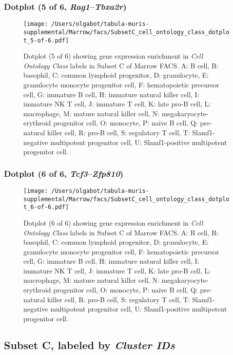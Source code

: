 \subsubsection{Dotplot (5 of 6, \emph{Rag1}--\emph{Tbxa2r})}
\begin{figure}[h]
\centering
\texttt{[image: /Users/olgabot/tabula-muris-supplemental/Marrow/facs/SubsetC\_cell\_ontology\_class\_dotplot\_5-of-6.pdf]}

\caption{ Dotplot (5 of 6)  showing gene expression enrichment in \emph{Cell Ontology Class} labels in Subset C of Marrow FACS. A: B cell, B: basophil, C: common lymphoid progenitor, D: granulocyte, E: granulocyte monocyte progenitor cell, F: hematopoietic precursor cell, G: immature B cell, H: immature natural killer cell, I: immature NK T cell, J: immature T cell, K: late pro-B cell, L: macrophage, M: mature natural killer cell, N: megakaryocyte-erythroid progenitor cell, O: monocyte, P: naive B cell, Q: pre-natural killer cell, R: pro-B cell, S: regulatory T cell, T: Slamf1-negative multipotent progenitor cell, U: Slamf1-positive multipotent progenitor cell.}
\end{figure}


\clearpage

\subsubsection{Dotplot (6 of 6, \emph{Tcf3}--\emph{Zfp810})}
\begin{figure}[h]
\centering
\texttt{[image: /Users/olgabot/tabula-muris-supplemental/Marrow/facs/SubsetC\_cell\_ontology\_class\_dotplot\_6-of-6.pdf]}

\caption{ Dotplot (6 of 6)  showing gene expression enrichment in \emph{Cell Ontology Class} labels in Subset C of Marrow FACS. A: B cell, B: basophil, C: common lymphoid progenitor, D: granulocyte, E: granulocyte monocyte progenitor cell, F: hematopoietic precursor cell, G: immature B cell, H: immature natural killer cell, I: immature NK T cell, J: immature T cell, K: late pro-B cell, L: macrophage, M: mature natural killer cell, N: megakaryocyte-erythroid progenitor cell, O: monocyte, P: naive B cell, Q: pre-natural killer cell, R: pro-B cell, S: regulatory T cell, T: Slamf1-negative multipotent progenitor cell, U: Slamf1-positive multipotent progenitor cell.}
\end{figure}


\clearpage

\subsection{Subset C, labeled by \emph{Cluster IDs}}
